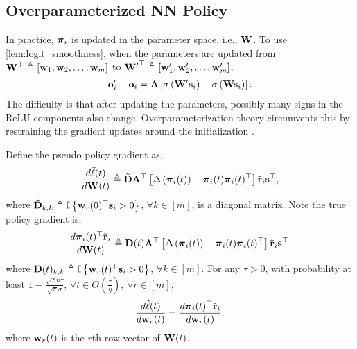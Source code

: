 \subsection{Overparameterized NN Policy}
\label{subsec:overparameterized_nn_policy}

In practice, ${\boldsymbol{\pi}}_i$ is updated in the parameter space, i.e., ${\mathbf{W}}$. To use \cref{lem:logit_smoothness}, when the parameters are updated from ${\mathbf{W}}^\top \triangleq \left[ {\mathbf{w}}_1, {\mathbf{w}}_2, \dots, {\mathbf{w}}_m \right]$ to ${{\mathbf{W}}^\prime}^\top \triangleq \left[ {\mathbf{w}}_1^\prime, {\mathbf{w}}_2^\prime, \dots, {\mathbf{w}}_m^\prime \right]$,
\begin{equation*}
\begin{split}
    {\mathbf{o}}_i^\prime - {\mathbf{o}}_i = {\mathbf{A}} \left[ \sigma \left( {\mathbf{W}}^\prime {\mathbf{s}}_i \right) - \sigma \left( {\mathbf{W}} {\mathbf{s}}_i \right) \right].
\end{split}
\end{equation*}
The difficulty is that after updating the parameters, possibly many signs in the ReLU components also change. Overparameterization theory circumvents this by restraining the gradient updates around the initialization \citep{li2018learning}.

\begin{lem}
\label{lem:gradient_coupling}
	Define the pseudo policy gradient as,
\begin{equation*}
\begin{split}
	\frac{d \tilde{\ell}(t)}{d {\mathbf{W}}(t)} \triangleq \tilde{{\mathbf{D}}} {\mathbf{A}}^\top \left[ \Delta\left( {\boldsymbol{\pi}}_i(t) \right) - {\boldsymbol{\pi}}_i(t) {\boldsymbol{\pi}}_i(t)^\top \right] {\tilde{\mathbf{r}}}_i {\mathbf{s}}^\top,
\end{split}
\end{equation*}
where $\tilde{{\mathbf{D}}}_{k,k} \triangleq {\mathbb{I}}\left\{ {\mathbf{w}}_r(0)^\top {\mathbf{s}}_i > 0 \right\}$, $\forall k \in [m]$, is a diagonal matrix. Note the true policy gradient is,
\begin{equation*}
\begin{split}
    \frac{d {\boldsymbol{\pi}}_i(t)^\top {\tilde{\mathbf{r}}}_i}{d {\mathbf{W}}(t)} \triangleq {\mathbf{D}}(t) {\mathbf{A}}^\top \left[ \Delta\left( {\boldsymbol{\pi}}_i(t) \right) - {\boldsymbol{\pi}}_i(t) {\boldsymbol{\pi}}_i(t)^\top \right] {\tilde{\mathbf{r}}}_i {\mathbf{s}}^\top.
\end{split}
\end{equation*}
where ${\mathbf{D}}(t)_{k,k} \triangleq {\mathbb{I}}\left\{ {\mathbf{w}}_r(t)^\top {\mathbf{s}}_i > 0 \right\}$, $\forall k \in [m]$. For any $\tau > 0$, with probability at least $1 - \frac{\sqrt{2}n\tau}{\sqrt{\pi}\sigma}$, $\forall t \in O\left(\frac{\tau}{\eta}\right)$, $\forall r \in [m]$,
\begin{equation*}
	\frac{d\tilde{\ell}(t)}{d {\mathbf{w}}_r(t)} = \frac{d {\boldsymbol{\pi}}_i(t)^\top {\tilde{\mathbf{r}}}_i}{d {\mathbf{w}}_r(t)},
\end{equation*}
where ${\mathbf{w}}_r(t)$ is the $r$th row vector of ${\mathbf{W}}(t)$.
\end{lem}

